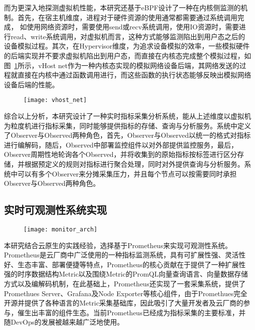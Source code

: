而为更深入地探测虚拟机性能，本研究还基于eBPF设计了一种在内核侧监测的机制。首先，在宿主机维度，进程对于硬件资源的使用通常都需要通过系统调用完成， 如使用网络资源时，需要使用send或recv系统调用，使用IO资源时，需要进行read、write系统调用，对虚拟机而言，这种方式能够监测陷出到用户态之后的设备模拟过程。其次，在Hypervisor维度，为追求设备模拟的效率，一些模拟硬件的后端实现并不要求虚拟机陷出到用户态，而直接在内核态完成整个模拟过程，如图~\ref{fig:vhost_net}所示，vHost net作为一种内核态实现的模拟网络设备后端，其网络发送的过程就直接在内核中通过函数调用进行，而这些函数的执行状态能够反映出模拟网络设备后端的性能。

\begin{figure}[!htbp]
    \centering
    \texttt{[image: vhost\_net]}
    \label{fig:vhost_net}
\end{figure}

综合以上分析，本研究设计了一种实时指标采集分析系统，能从上述维度以虚拟机为粒度机进行指标采集，同时能够提供指标的存储、查询与分析服务。系统中定义了Observer与Observed两种角色，首先，Observer与Observed以统一的格式对指标进行编解码，随后，Observed中部署监控组件以对外部提供监控服务，最后，Observer周期性地轮询各个Observed，并将收集到的原始指标按标签进行区分存储，并根据预定义的规则对指标进行聚合处理，同时对外提供查询与分析服务。系统中可以有多个Observer来分摊采集压力，并且每个节点可以按需要同时承担Observer与Observed两种角色。

\subsection{实时可观测性系统实现}


\begin{figure}[!htbp]
    \centering
    \texttt{[image: monitor\_arch]}
    \label{fig:monitor_arch}
\end{figure}

本研究结合云原生的实践经验，选择基于Prometheus来实现可观测性系统。Prometheus\citep{prometheus}是云厂商中广泛使用的一种指标监测系统，具有可扩展性强、灵活性好、生态丰富、部署便捷等特点，Prometheus的核心贡献在于提供了一种扩展性强的时序数据结构Metric以及围绕Metric的PromQL向量查询语言、向量数据存储方式以及编解码机制，在此基础上，Prometheus还实现了一套采集系统，提供了Promethues Server、Grafana及Node Exporter等核心组件，由于Promethues完全开源并提供了各种语言的Metric采集基础库，因此吸引了大量开发者及云厂商的参与，催生出丰富的组件生态。当前Prometheus已经成为指标采集的主要标准，并随DevOps的发展被越来越广泛地使用。

